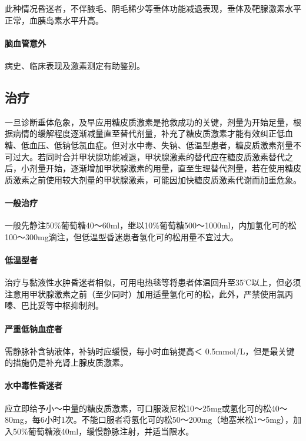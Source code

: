 此种情况昏迷者，不伴腋毛、阴毛稀少等垂体功能减退表现，垂体及靶腺激素水平正常，血胰岛素水平升高。

\paragraph{脑血管意外}

病史、临床表现及激素测定有助鉴别。

\subsection{治疗}

一旦诊断垂体危象，及早应用糖皮质激素是抢救成功的关键，剂量为开始足量，根据病情的缓解程度逐渐减量直至替代剂量，补充了糖皮质激素才能有效纠正低血糖、低血压、低钠低氯血症。但对水中毒、失钠、低温型患者，糖皮质激素剂量不可过大。若同时合并甲状腺功能减退，甲状腺激素的替代应在糖皮质激素替代之后，小剂量开始，逐渐增加甲状腺激素的用量，直至生理替代剂量，若在使用糖皮质激素之前使用较大剂量的甲状腺激素，可能因加快糖皮质激素代谢而加重危象。

\paragraph{一般治疗}

一般先静注50\%葡萄糖40～60ml，继以10\%葡萄糖500～1000ml，内加氢化可的松100～300mg滴注，但低温型昏迷患者氢化可的松用量不宜过大。

\paragraph{低温型者}

治疗与黏液性水肿昏迷者相似，可用电热毯等将患者体温回升至35℃以上，但必须注意用甲状腺激素之前（至少同时）加用适量氢化可的松，此外，严禁使用氯丙嗪、巴比妥等中枢抑制剂。

\paragraph{严重低钠血症者}

需静脉补含钠液体，补钠时应缓慢，每小时血钠提高＜
0.5mmol/L，但是最关键的措施仍是补充肾上腺皮质激素。

\paragraph{水中毒性昏迷者}

应立即给予小～中量的糖皮质激素，可口服泼尼松10～25mg或氢化可的松40～80mg，每6小时1次。不能口服者将氢化可的松50～200mg（地塞米松1～5mg），加入50\%葡萄糖液40ml，缓慢静脉注射，并适当限水。

